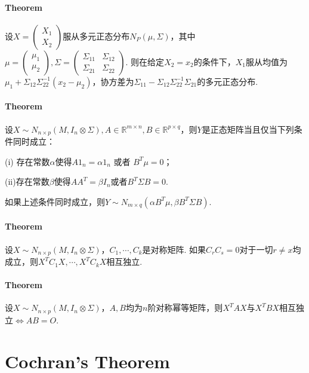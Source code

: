 \documentclass[a4paper,11pt]{article}
\begin{document}
\paragraph{Theorem} 
设$X = \begin{pmatrix} X_1\\ X_2 \end{pmatrix}$服从多元正态分布$N_P(\mu, \Sigma)$，其中$\mu = \begin{pmatrix} \mu_1 \\ \mu_2 \end{pmatrix}, \Sigma = \begin{pmatrix} \Sigma_{11} & \Sigma_{12}\\ \Sigma_{21} & \Sigma_{22} \end{pmatrix}$. 则在给定$X_2 = x_2$的条件下，$X_1$服从均值为$\mu_1 + \Sigma_{12}\Sigma_{22}^{-1}(x_2 - \mu_2)$，协方差为$\Sigma_{11} - \Sigma_{12}\Sigma_{22}^{-1}\Sigma_{21}$的多元正态分布. 

\paragraph{Theorem}
设$X\sim N_{n\times p}(M, I_n\otimes\Sigma), A\in\mathbb{R}^{m\times n}, B\in\mathbb{R}^{p\times q}$，则$Y$是正态矩阵当且仅当下列条件同时成立：

(i) 存在常数$\alpha$使得$A1_n = \alpha 1_n$ 或者 $B^T\mu = 0$；

(ii)存在常数$\beta$使得$AA^T = \beta I_n$或者$B^T\Sigma B = 0$. 

如果上述条件同时成立，则$Y\sim N_{m\times q}(\alpha B^T\mu, \beta B^T\Sigma B)$.

\paragraph{Theorem}
设$X\sim N_{n\times p}(M, I_n\otimes\Sigma)$，$C_1, \cdots , C_k$是对称矩阵. 如果$ C_rC_s = 0$对于一切$r\neq x$均成立，则$X^TC_1X, \cdots , X^TC_kX$相互独立.

\paragraph{Theorem}
设$X \sim N_{n\times p}(M, I_n\otimes\Sigma)$，$A, B$均为$n$阶对称幂等矩阵，则$X^TAX$与$X^TBX$相互独立$\Leftrightarrow AB = O$. 

\section{Cochran's Theorem}
\end{document}
